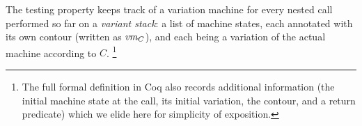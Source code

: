 \documentclass[acmsmall,review,anonymous]{acmart}\settopmatter{printfolios=true,printccs=false,printacmref=false}
\begin{document}
{ The testing property keeps track of a variation machine
for every nested call performed so far on a {\em variant stack}: a
list of machine states, each annotated with its own contour (written
as $\mathit{vm}_{C}$), and each being a variation of the actual machine
according to $C$.%
%
\footnote{The full formal definition in Coq also records additional
  information (the initial machine state at the call, its initial
  variation, the contour, and a return predicate) which we elide
  here for simplicity of exposition.}



}
\end{document}

